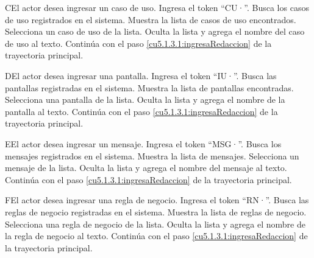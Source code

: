  \begin{UCtrayectoriaA}{C}{El actor desea ingresar un caso de uso.}
  	\UCpaso[\UCactor] Ingresa el token ``CU·''.	
 	\UCpaso[\UCsist] Busca los casos de uso registrados en el sistema. 
 	\UCpaso[\UCsist] Muestra la lista de casos de uso encontrados.
 	\UCpaso[\UCactor] Selecciona un caso de uso de la lista.
  	\UCpaso[\UCsist] Oculta la lista y agrega el nombre del caso de uso al texto.
    \UCpaso[] Continúa con el paso \ref{cu5.1.3.1:ingresaRedaccion} de la trayectoria principal.
 \end{UCtrayectoriaA}

 \begin{UCtrayectoriaA}{D}{El actor desea ingresar una pantalla.}
 	\UCpaso[\UCactor] Ingresa el token ``IU·''.	
 	\UCpaso[\UCsist] Busca las pantallas registradas en el sistema. 
 	\UCpaso[\UCsist] Muestra la lista de pantallas encontradas.
 	\UCpaso[\UCactor] Selecciona una pantalla de la lista.
  	\UCpaso[\UCsist] Oculta la lista y agrega el nombre de la pantalla al texto.
    \UCpaso[] Continúa con el paso \ref{cu5.1.3.1:ingresaRedaccion} de la trayectoria principal.
 \end{UCtrayectoriaA}

 \begin{UCtrayectoriaA}{E}{El actor desea ingresar un mensaje.}
 	 \UCpaso[\UCactor] Ingresa el token ``MSG·''.	
 	\UCpaso[\UCsist] Busca los mensajes registrados en el sistema. 
 	\UCpaso[\UCsist] Muestra la lista de mensajes.
 	\UCpaso[\UCactor] Selecciona un mensaje de la lista.
  	\UCpaso[\UCsist] Oculta la lista y agrega el nombre del mensaje al texto.
    \UCpaso[] Continúa con el paso \ref{cu5.1.3.1:ingresaRedaccion} de la trayectoria principal.
 \end{UCtrayectoriaA}

 \begin{UCtrayectoriaA}{F}{El actor desea ingresar una regla de negocio.}
 	\UCpaso[\UCactor] Ingresa el token ``RN·''.	
 	\UCpaso[\UCsist] Busca las reglas de negocio registradas en el sistema. 
 	\UCpaso[\UCsist] Muestra la lista de reglas de negocio.
 	\UCpaso[\UCactor] Selecciona una regla de negocio de la lista.
  	\UCpaso[\UCsist] Oculta la lista y agrega el nombre de la regla de negocio al texto.
    \UCpaso[] Continúa con el paso \ref{cu5.1.3.1:ingresaRedaccion} de la trayectoria principal.
 \end{UCtrayectoriaA}

